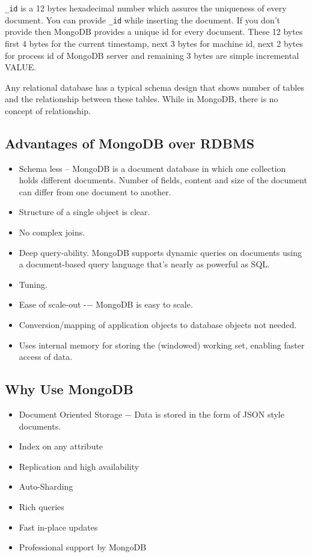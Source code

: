 \documentclass[12pt]{article}
\begin{document}
\verb=_id= is a 12 bytes hexadecimal number which assures the uniqueness
of every document. You can provide \verb=_id= while inserting the
document. If you don’t provide then MongoDB provides a unique id for
every document. These 12 bytes first 4 bytes for the current timestamp,
next 3 bytes for machine id, next 2 bytes for process id of MongoDB
server and remaining 3 bytes are simple incremental VALUE.

Any relational database has a typical schema design that shows number of
tables and the relationship between these tables. While in MongoDB,
there is no concept of relationship.

\subsection{Advantages of MongoDB over RDBMS}

\begin{itemize}
  \item Schema less -- MongoDB is a document database in which one
    collection holds different documents. Number of fields, content and
    size of the document can differ from one document to another.

  \item Structure of a single object is clear.

  \item No complex joins.

  \item Deep query-ability. MongoDB supports dynamic queries on
    documents using a document-based query language that's nearly as
    powerful as SQL.

  \item Tuning.

  \item Ease of scale-out -− MongoDB is easy to scale.

  \item Conversion/mapping of application objects to database objects not needed.

  \item Uses internal memory for storing the (windowed) working set,
    enabling faster access of data.
\end{itemize}

\subsection{Why Use MongoDB}

\begin{itemize}
  \item Document Oriented Storage − Data is stored in the form of JSON style documents.
  \item Index on any attribute
  \item Replication and high availability
  \item Auto-Sharding
  \item Rich queries
  \item Fast in-place updates
  \item Professional support by MongoDB
\end{itemize}
\end{document}
